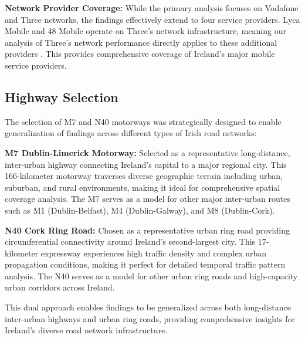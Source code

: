 \documentclass[MScCS]{uccthesis}
\begin{document}
   

   \textbf{Network Provider Coverage:} While the primary analysis focuses on Vodafone and Three networks, the findings effectively extend to four service providers. Lyca Mobile and 48 Mobile operate on Three's network infrastructure, meaning our analysis of Three's network performance directly applies to these additional providers \cite{mvnodetails_three_ie}. This provides comprehensive coverage of Ireland's major mobile service providers.
   
   


   \subsection{Highway Selection}
   The selection of M7 and N40 motorways was strategically designed to enable generalization of findings across different types of Irish road networks:

   \textbf{M7 Dublin-Limerick Motorway:} Selected as a representative long-distance, inter-urban highway connecting Ireland's capital to a major regional city. This 166-kilometer motorway traverses diverse geographic terrain including urban, suburban, and rural environments, making it ideal for comprehensive spatial coverage analysis. The M7 serves as a model for other major inter-urban routes such as M1 (Dublin-Belfast), M4 (Dublin-Galway), and M8 (Dublin-Cork).

   \textbf{N40 Cork Ring Road:} Chosen as a representative urban ring road providing circumferential connectivity around Ireland's second-largest city. This 17-kilometer expressway experiences high traffic density and complex urban propagation conditions, making it perfect for detailed temporal traffic pattern analysis. The N40 serves as a model for other urban ring roads and high-capacity urban corridors across Ireland.

   This dual approach enables findings to be generalized across both long-distance inter-urban highways and urban ring roads, providing comprehensive insights for Ireland's diverse road network infrastructure.
\end{document}
